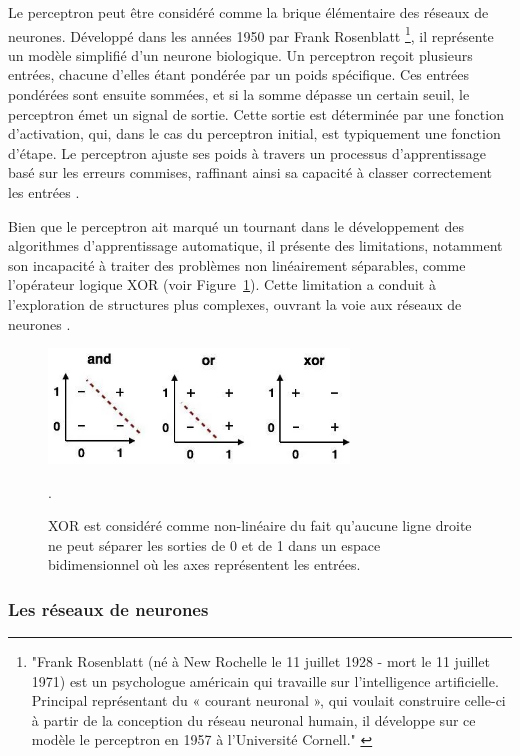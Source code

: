 Le perceptron peut être considéré comme la brique élémentaire des réseaux de neurones. Développé dans les années 1950 par Frank Rosenblatt \footnote{"Frank Rosenblatt (né à New Rochelle le 11 juillet 1928 - mort le 11 juillet 1971) est un psychologue américain qui travaille sur l'intelligence artificielle. Principal représentant du « courant neuronal », qui voulait construire celle-ci à partir de la conception du réseau neuronal humain, il développe sur ce modèle le perceptron en 1957 à l'Université Cornell." \cite{frwiki:213039317}}, il représente un modèle simplifié d'un neurone biologique. Un perceptron reçoit plusieurs entrées, chacune d'elles étant pondérée par un poids spécifique. Ces entrées pondérées sont ensuite sommées, et si la somme dépasse un certain seuil, le perceptron émet un signal de sortie. Cette sortie est déterminée par une fonction d'activation, qui, dans le cas du perceptron initial, est typiquement une fonction d'étape. Le perceptron ajuste ses poids à travers un processus d'apprentissage basé sur les erreurs commises, raffinant ainsi sa capacité à classer correctement les entrées \cite{wang2017origin}.

Bien que le perceptron ait marqué un tournant dans le développement des algorithmes d'apprentissage automatique, il présente des limitations, notamment son incapacité à traiter des problèmes non linéairement séparables, comme l'opérateur logique XOR (voir Figure~\ref{fig:perceptron-xor}). Cette limitation a conduit à l'exploration de structures plus complexes, ouvrant la voie aux réseaux de neurones  \cite{Min69}.

\begin{figure}[H]
    \centering
    \includegraphics[width=8cm]{gfx/fig-perceptron-xor.png}
    \caption{XOR est considéré comme non-linéaire du fait qu'aucune ligne droite ne peut séparer les sorties de 0 et de 1 dans un espace bidimensionnel où les axes représentent les entrées. \cite{Jaspreet_2022}}.
    \label{fig:perceptron-xor}
\end{figure}

\subsubsection{Les réseaux de neurones}

